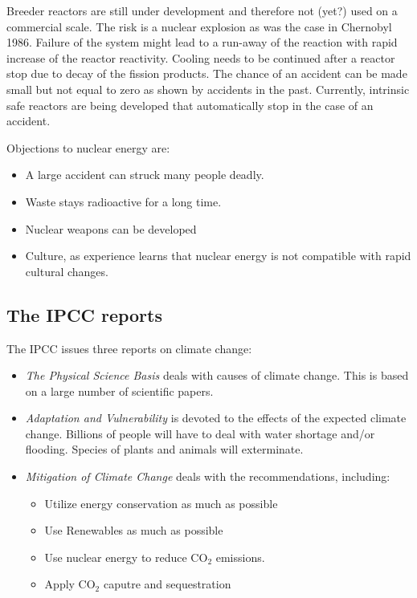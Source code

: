 \documentclass[a4paper,10pt]{article}
\begin{document}
Breeder reactors are still under development and therefore not (yet?) used on a commercial scale. The risk is a nuclear explosion as was the case in Chernobyl 1986. Failure of the system might lead to a run-away of the reaction with rapid increase of the reactor reactivity. Cooling needs to be continued after a reactor stop due to decay of the fission products. The chance of an accident can be made small but not equal to zero as shown by accidents in the past. Currently, intrinsic safe reactors are being developed that automatically stop in the case of an accident. \bigskip

Objections to nuclear energy are:
\begin{itemize}
 \item A large accident can struck many people deadly.
 \item Waste stays radioactive for a long time.
 \item Nuclear weapons can be developed
 \item Culture, as experience learns that nuclear energy is not compatible with rapid cultural changes.
\end{itemize}

\subsection{The IPCC reports}
The IPCC issues three reports on climate change:
\begin{itemize}
 \item \emph{The Physical Science Basis} deals with causes of climate change. This is based on a large number of scientific papers.
 \item \emph{Adaptation and Vulnerability} is devoted to the effects of the expected climate change. Billions of people will have to deal with water shortage and/or flooding. Species of plants and animals will exterminate.
 \item \emph{Mitigation of Climate Change} deals with the recommendations, including:
 \begin{itemize}
  \item Utilize energy conservation as much as possible
  \item Use Renewables as much as possible
  \item Use nuclear energy to reduce CO$_2$ emissions.
  \item Apply CO$_2$ caputre and sequestration
 \end{itemize}
\end{itemize}
\end{document}
